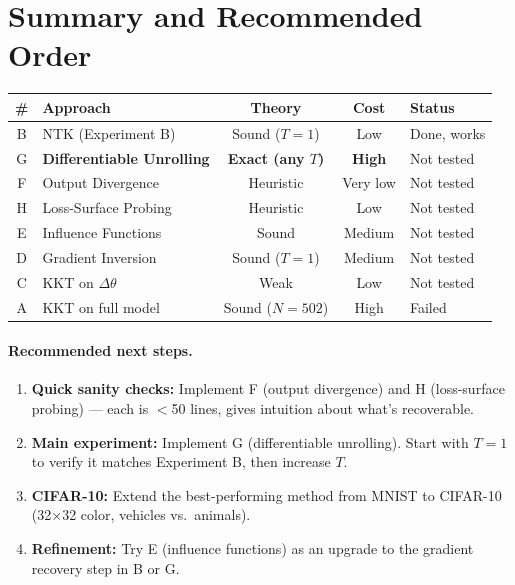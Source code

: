 \documentclass[11pt,a4paper]{article}
\begin{document}
\section{Summary and Recommended Order}

\begin{center}
\begin{tabular}{clccl}
\toprule
\textbf{\#} & \textbf{Approach} & \textbf{Theory} & \textbf{Cost} & \textbf{Status} \\
\midrule
B & NTK (Experiment B)         & Sound ($T{=}1$)   & Low      & \colorbox{green!15}{Done, works} \\
G & \textbf{Differentiable Unrolling} & \textbf{Exact (any $T$)} & \textbf{High} & Not tested \\
F & Output Divergence           & Heuristic         & Very low & Not tested \\
H & Loss-Surface Probing        & Heuristic         & Low      & Not tested \\
E & Influence Functions         & Sound             & Medium   & Not tested \\
D & Gradient Inversion          & Sound ($T{=}1$)   & Medium   & Not tested \\
C & KKT on $\Delta\theta$      & Weak              & Low      & Not tested \\
A & KKT on full model           & Sound ($N{=}502$) & High     & \colorbox{red!15}{Failed} \\
\bottomrule
\end{tabular}
\end{center}

\paragraph{Recommended next steps.}
\begin{enumerate}
  \item \textbf{Quick sanity checks:} Implement F (output divergence) and H (loss-surface probing) — each is $<$50 lines, gives intuition about what's recoverable.
  \item \textbf{Main experiment:} Implement G (differentiable unrolling). Start with $T{=}1$ to verify it matches Experiment B, then increase $T$.
  \item \textbf{CIFAR-10:} Extend the best-performing method from MNIST to CIFAR-10 (32$\times$32 color, vehicles vs.\ animals).
  \item \textbf{Refinement:} Try E (influence functions) as an upgrade to the gradient recovery step in B or G.
\end{enumerate}
\end{document}
